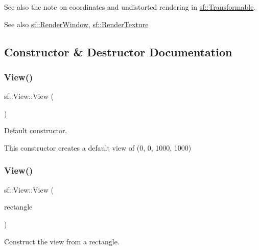 See also the note on coordinates and undistorted rendering in \hyperlink{classsf_1_1_transformable}{sf\+::\+Transformable}.

\begin{DoxySeeAlso}{See also}
\hyperlink{classsf_1_1_render_window}{sf\+::\+Render\+Window}, \hyperlink{classsf_1_1_render_texture}{sf\+::\+Render\+Texture} 
\end{DoxySeeAlso}


\subsection{Constructor \& Destructor Documentation}
\mbox{\label{classsf_1_1_view_a28c38308ff089ae5bdacd001d12286d3}} 
\subsubsection{\texorpdfstring{View()}{View()}\hspace{0.1cm}{\footnotesize\ttfamily [1/3]}}
{\footnotesize\ttfamily sf\+::\+View\+::\+View (\begin{DoxyParamCaption}{ }\end{DoxyParamCaption})}



Default constructor. 

This constructor creates a default view of (0, 0, 1000, 1000) \mbox{\label{classsf_1_1_view_a1d63bc49e041b3b1ff992bb6430e1326}} 
\subsubsection{\texorpdfstring{View()}{View()}\hspace{0.1cm}{\footnotesize\ttfamily [2/3]}}
{\footnotesize\ttfamily sf\+::\+View\+::\+View (\begin{DoxyParamCaption}\item[{const \hyperlink{classsf_1_1_rect}{Float\+Rect} \&}]{rectangle }\end{DoxyParamCaption})\hspace{0.3cm}{\ttfamily [explicit]}}



Construct the view from a rectangle. 


